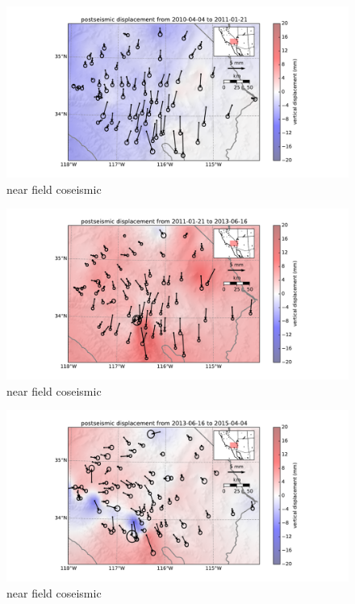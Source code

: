 \documentclass[12pt]{article}
\begin{document}
\begin{figure}
\includegraphics[scale=0.6]{Figures/far_field_data_2}
\centering 
\caption{near field coseismic}
\label{farfield2}
\end{figure}

\begin{figure}
\includegraphics[scale=0.6]{Figures/far_field_data_3}
\centering 
\caption{near field coseismic}
\label{farfield3}
\end{figure}

\begin{figure}
\includegraphics[scale=0.6]{Figures/far_field_data_4}
\centering 
\caption{near field coseismic}
\label{farfield4}
\end{figure}
\end{document}
